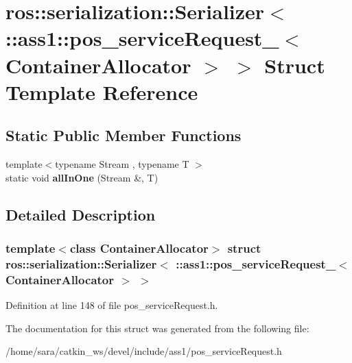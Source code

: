 \hypertarget{structros_1_1serialization_1_1Serializer_3_01_1_1ass1_1_1pos__serviceRequest___3_01ContainerAllocator_01_4_01_4}{}\section{ros\+:\+:serialization\+:\+:Serializer$<$ \+:\+:ass1\+:\+:pos\+\_\+service\+Request\+\_\+$<$ Container\+Allocator $>$ $>$ Struct Template Reference}
\label{structros_1_1serialization_1_1Serializer_3_01_1_1ass1_1_1pos__serviceRequest___3_01ContainerAllocator_01_4_01_4}
\subsection*{Static Public Member Functions}
\begin{DoxyCompactItemize}
\item 
\mbox{\label{structros_1_1serialization_1_1Serializer_3_01_1_1ass1_1_1pos__serviceRequest___3_01ContainerAllocator_01_4_01_4_abe3453a8f3f84747e14168e49d6ca574}} 
{\footnotesize template$<$typename Stream , typename T $>$ }\\static void {\bfseries all\+In\+One} (Stream \&, T)
\end{DoxyCompactItemize}


\subsection{Detailed Description}
\subsubsection*{template$<$class Container\+Allocator$>$\newline
struct ros\+::serialization\+::\+Serializer$<$ \+::ass1\+::pos\+\_\+service\+Request\+\_\+$<$ Container\+Allocator $>$ $>$}



Definition at line 148 of file pos\+\_\+service\+Request.\+h.



The documentation for this struct was generated from the following file\+:\begin{DoxyCompactItemize}
\item 
/home/sara/catkin\+\_\+ws/devel/include/ass1/pos\+\_\+service\+Request.\+h\end{DoxyCompactItemize}
